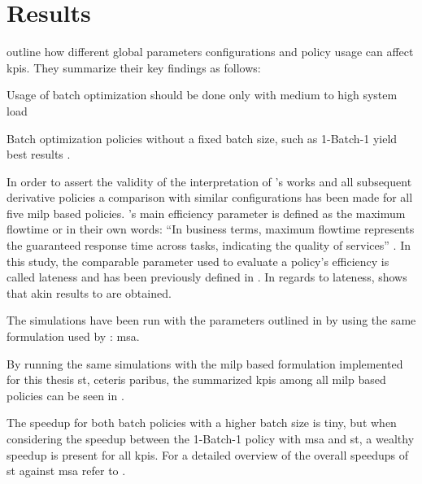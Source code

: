 \section{ Results}
\label{sec:opt_results}

\citet[pp. 18--22]{Zeng2005} outline how different global parameters configurations and policy usage can affect \glspl{kpi}. They summarize their key findings as follows:
\begin{enumerate*}
	\item Usage of batch optimization should be done only with medium to high system load \citep[p. 24]{Zeng2005}
	\item Batch optimization policies without a fixed batch size, such as 1-Batch-1 yield best results \citep[p. 24]{Zeng2005}.
\end{enumerate*}

In order to assert the validity of the interpretation of \citet{Zeng2005}'s works and all subsequent derivative policies a comparison with similar configurations has been made for all five \gls{milp} based policies. \citet{Zeng2005}'s main efficiency parameter is defined as the maximum flowtime or in their own words: ``In business terms, maximum flowtime represents the guaranteed response time across tasks, indicating the quality of services'' \citep[p. 17]{Zeng2005}. In this study, the comparable parameter used to evaluate a policy's efficiency is called lateness and has been previously defined in . In regards to lateness,  shows that akin results to \citet{Zeng2005} are obtained.


The simulations have been run with the parameters outlined in  by using the same formulation used by \citet{Zeng2005}: \gls{msa}.

By running the same simulations with the \gls{milp} based formulation implemented for this thesis \ie \gls{st}, ceteris paribus, the summarized \glspl{kpi} among all \gls{milp} based policies can be seen in .


The speedup for both batch policies with a higher batch size is tiny, but when considering the speedup between the 1-Batch-1 policy with \gls{msa} and \gls{st}, a wealthy speedup is present for all \glspl{kpi}. For a detailed overview of the overall speedups of \gls{st} against \gls{msa} refer to .

